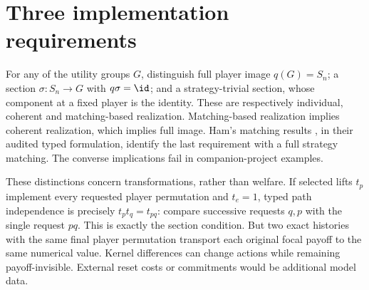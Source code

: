 \section{Three implementation requirements}
For any of the utility groups $G$, distinguish full player image
$q(G)=S_n$; a section $\sigma:S_n\to G$ with $q\sigma=\id$; and a
strategy-trivial section, whose component at a fixed player is the identity.
These are respectively individual, coherent and matching-based realization.
Matching-based realization implies coherent realization, which implies full
image. Ham's matching results \citep[\S4--5]{ham2021}, in their audited typed
formulation, identify the last requirement with a full strategy matching.
The converse implications fail in companion-project examples.

These distinctions concern transformations, rather than welfare. If selected
lifts $t_p$ implement every requested player permutation and $t_e=1$, typed
path independence is precisely $t_pt_q=t_{pq}$: compare successive requests
$q,p$ with the single request $pq$. This is exactly the section condition.
But two exact histories with the same final player permutation transport each
original focal payoff to the same numerical value. Kernel differences can
change actions while remaining payoff-invisible. External reset costs or
commitments would be additional model data.
